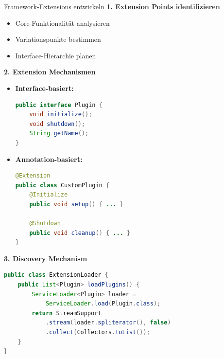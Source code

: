 \begin{KR}{Framework-Extensions entwickeln}
\textbf{1. Extension Points identifizieren}
\begin{itemize}
    \item Core-Funktionalität analysieren
    \item Variationspunkte bestimmen
    \item Interface-Hierarchie planen
\end{itemize}

\textbf{2. Extension Mechanismen}
\begin{itemize}
    \item \textbf{Interface-basiert:}
    \begin{lstlisting}[language=Java, style=base]
public interface Plugin {
    void initialize();
    void shutdown();
    String getName();
}
    \end{lstlisting}
    
    \item \textbf{Annotation-basiert:}
    \begin{lstlisting}[language=Java, style=base]
@Extension
public class CustomPlugin {
    @Initialize
    public void setup() { ... }
    
    @Shutdown
    public void cleanup() { ... }
}
    \end{lstlisting}
\end{itemize}

\textbf{3. Discovery Mechanism}
\begin{lstlisting}[language=Java, style=base]
public class ExtensionLoader {
    public List<Plugin> loadPlugins() {
        ServiceLoader<Plugin> loader = 
            ServiceLoader.load(Plugin.class);
        return StreamSupport
            .stream(loader.spliterator(), false)
            .collect(Collectors.toList());
    }
}
\end{lstlisting}
\end{KR}

